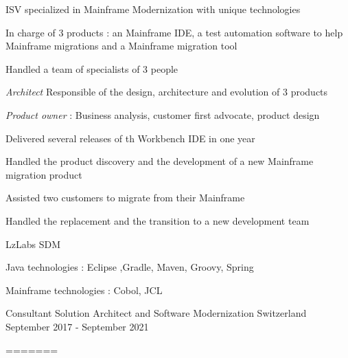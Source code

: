 \begin{cventries}
{{\begin{cvitems}
                    \item{ISV specialized in Mainframe Modernization with unique technologies}
                    \item{In charge of 3 products : an Mainframe IDE, a test automation software to help Mainframe migrations and a Mainframe migration tool }
                    \item{Handled a team of specialists of 3 people}
                    \item {\emph{Architect} Responsible of the design, architecture and evolution of 3 products }
                    \item {\emph{Product owner} : Business analysis, customer first advocate, product design }
                    \end{cvitems}
            }
            {
               \begin{cvitems} %
                \item {Delivered several releases of th Workbench IDE in one year }
                \item {Handled the product discovery and the development of a new Mainframe migration product }
                \item {Assisted two customers to migrate from their Mainframe }
                \item {Handled the replacement and the transition to a new development team}
               \end{cvitems}
            }
            {
                \begin{cvitems} %
                    \item{LzLabs SDM}
                    \item{Java technologies : Eclipse ,Gradle, Maven, Groovy, Spring}
                    \item{Mainframe technologies : Cobol, JCL}
                \end{cvitems}
            }            
    }
        \cventry
        {Consultant} %
        {Solution Architect and Software Modernization} %
        {Switzerland} %
        {September 2017 - September 2021} %
        {}

        \cventry
        {} %
        {} %
        {} %
        {} %
=======
       

\end{cventries}
